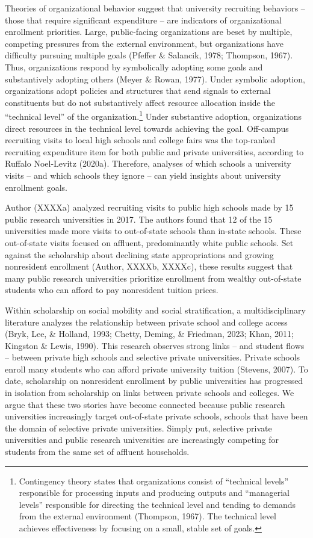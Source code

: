 \documentclass[
  12pt,
]{article}
\begin{document}
Theories of organizational behavior suggest that university recruiting behaviors -- those that require significant expenditure -- are indicators of organizational enrollment priorities. Large, public-facing organizations are beset by multiple, competing pressures from the external environment, but organizations have difficulty pursuing multiple goals (Pfeffer \& Salancik, 1978; Thompson, 1967). Thus, organizations respond by symbolically adopting some goals and substantively adopting others (Meyer \& Rowan, 1977). Under symbolic adoption, organizations adopt policies and structures that send signals to external constituents but do not substantively affect resource allocation inside the ``technical level'' of the organization.\footnote{Contingency theory states that organizations consist of ``technical levels'' responsible for processing inputs and producing outputs and ``managerial levels'' responsible for directing the technical level and tending to demands from the external environment (Thompson, 1967). The technical level achieves effectiveness by focusing on a small, stable set of goals.} Under substantive adoption, organizations direct resources in the technical level towards achieving the goal. Off-campus recruiting visits to local high schools and college fairs was the top-ranked recruiting expenditure item for both public and private universities, according to Ruffalo Noel-Levitz (2020a). Therefore, analyses of which schools a university visits -- and which schools they ignore -- can yield insights about university enrollment goals.

Author (XXXXa) analyzed recruiting visits to public high schools made by 15 public research universities in 2017. The authors found that 12 of the 15 universities made more visits to out-of-state schools than in-state schools. These out-of-state visits focused on affluent, predominantly white public schools. Set against the scholarship about declining state appropriations and growing nonresident enrollment (Author, XXXXb, XXXXc), these results suggest that many public research universities prioritize enrollment from wealthy out-of-state students who can afford to pay nonresident tuition prices.

Within scholarship on social mobility and social stratification, a multidisciplinary literature analyzes the relationship between private school and college access (Bryk, Lee, \& Holland, 1993; Chetty, Deming, \& Friedman, 2023; Khan, 2011; Kingston \& Lewis, 1990). This research observes strong links -- and student flows -- between private high schools and selective private universities. Private schools enroll many students who can afford private university tuition (Stevens, 2007). To date, scholarship on nonresident enrollment by public universities has progressed in isolation from scholarship on links between private schools and colleges. We argue that these two stories have become connected because public research universities increasingly target out-of-state private schools, schools that have been the domain of selective private universities. Simply put, selective private universities and public research universities are increasingly competing for students from the same set of affluent households.
\end{document}
